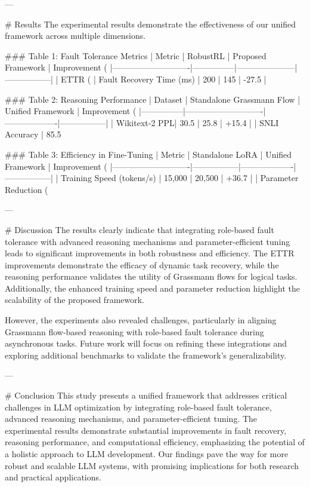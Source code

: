 ---

# Results  
The experimental results demonstrate the effectiveness of our unified framework across multiple dimensions.  

### Table 1: Fault Tolerance Metrics  
| Metric                     | RobustRL      | Proposed Framework | Improvement (%
|----------------------------|---------------|---------------------|-----------------|
| ETTR (%
| Fault Recovery Time (ms)   | 200           | 145                 | -27.5           |

### Table 2: Reasoning Performance  
| Dataset       | Standalone Grassmann Flow | Unified Framework | Improvement (%
|---------------|----------------------------|-------------------|-----------------|
| Wikitext-2 PPL| 30.5                       | 25.8              | +15.4           |
| SNLI Accuracy | 85.5%

### Table 3: Efficiency in Fine-Tuning  
| Metric                     | Standalone LoRA | Unified Framework | Improvement (%
|----------------------------|-----------------|-------------------|-----------------|
| Training Speed (tokens/s)  | 15,000         | 20,500            | +36.7           |
| Parameter Reduction (%

---

# Discussion  
The results clearly indicate that integrating role-based fault tolerance with advanced reasoning mechanisms and parameter-efficient tuning leads to significant improvements in both robustness and efficiency. The ETTR improvements demonstrate the efficacy of dynamic task recovery, while the reasoning performance validates the utility of Grassmann flows for logical tasks. Additionally, the enhanced training speed and parameter reduction highlight the scalability of the proposed framework.

However, the experiments also revealed challenges, particularly in aligning Grassmann flow-based reasoning with role-based fault tolerance during asynchronous tasks. Future work will focus on refining these integrations and exploring additional benchmarks to validate the framework's generalizability.

---

# Conclusion  
This study presents a unified framework that addresses critical challenges in LLM optimization by integrating role-based fault tolerance, advanced reasoning mechanisms, and parameter-efficient tuning. The experimental results demonstrate substantial improvements in fault recovery, reasoning performance, and computational efficiency, emphasizing the potential of a holistic approach to LLM development. Our findings pave the way for more robust and scalable LLM systems, with promising implications for both research and practical applications.

